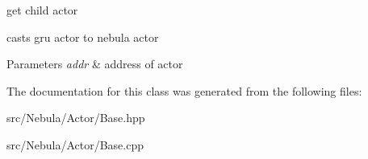 get child actor 

casts gru actor to nebula actor 
\begin{DoxyParams}{\-Parameters}
{\em addr} & address of actor \\
\hline
\end{DoxyParams}


\-The documentation for this class was generated from the following files\-:\begin{DoxyCompactItemize}
\item 
src/\-Nebula/\-Actor/\-Base.\-hpp\item 
src/\-Nebula/\-Actor/\-Base.\-cpp\end{DoxyCompactItemize}
